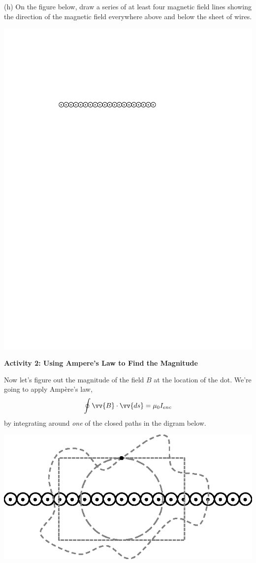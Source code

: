(h) On the figure below, draw a series of at least four magnetic field lines showing the direction of the magnetic field everywhere above and below the sheet of wires.
\begin{center}
\centerline{\includegraphics{amperes_law_infinite_sheet/wires_without_dot.pdf}}
\end{center}

\textbf{Activity 2: Using Ampere's Law to Find the Magnitude}

Now let's figure out the magnitude of the field $B$ at the location of the dot.
We're going to apply Amp\`ere's law,
\begin{equation*}
\oint \vv{B}\cdot \vv{ds} = \mu_0 I_{enc}
\end{equation*}
by integrating around \textit{one} of the closed paths in the digram below.

\begin{center}
\includegraphics{amperes_law_infinite_sheet/wires_with_dot_and_paths.eps}
\end{center}

